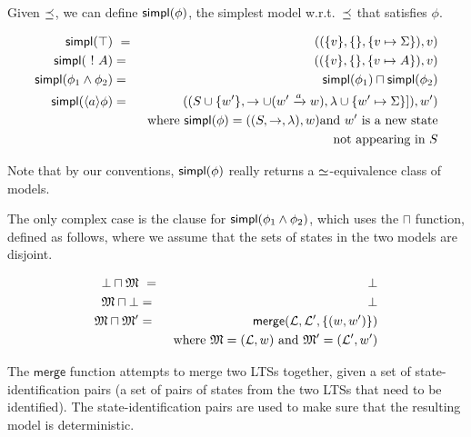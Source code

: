 Given $\preceq $, we can define $\mathsf{simpl}(\phi)$, the simplest model w.r.t.~$\preceq $ that
satisfies $\phi$.

\begin{eqnarray*}
  \mathsf{simpl}(\top) &\ = \ & ( (\{v\}, \{\}, \{v \mapsto \Sigma\}), v)  \\
  \mathsf{simpl}(\ ! \  A) & = & ( (\{v\}, \{\}, \{v \mapsto A\}), v)  \\
  \mathsf{simpl}(\phi_1 \land \phi_2) & = & \mathsf{simpl}(\phi_1) \sqcap \mathsf{simpl}(\phi_2)  \\
  \mathsf{simpl}(\langle a \rangle \phi) 
     & = & ( (S \cup \{w'\}, \rightarrow \cup (w' \xrightarrow{a} w), \lambda \cup \{w' \mapsto \Sigma\}]), w')  \\
		& & \mbox{where }\mathsf{simpl}(\phi) = ( (S, \rightarrow, \lambda), w) \mbox{and } w' \mbox{ is a new state} \\
                &&  \mbox{not appearing in }S 
\end{eqnarray*}





\NI Note that by our conventions, $\mathsf{simpl}(\phi)$ really returns a
$\simeq$-equivalence class of models.

The only complex case is the clause for $\mathsf{simpl}(\phi_1 \land \phi_2)$,
which uses the $\sqcap$ function, defined as follows, where we assume
that the sets of states in the two models are disjoint.

\begin{eqnarray*}
  \bot \sqcap \frak{M}  &\ =\ &  \bot  \\
  \frak{M} \sqcap \bot      & = &  \bot  
     \\
  \frak{M} \sqcap \frak{M}'
     & = & 
     \mathsf{merge}(\mathcal{L}, \mathcal{L}', \{(w,w')\}) 
     \\
     & & \text{where } \frak{M} = (\mathcal{L}, w) \text{ and } \frak{M}' = (\mathcal{L'}, w')
\end{eqnarray*}

\NI The $\mathsf{merge}$ function attempts to merge two LTSs together, given a set of state-identification pairs (a set of pairs of states from the two LTSs that need to be identified).
The state-identification pairs are used to make sure that the resulting model is deterministic.

